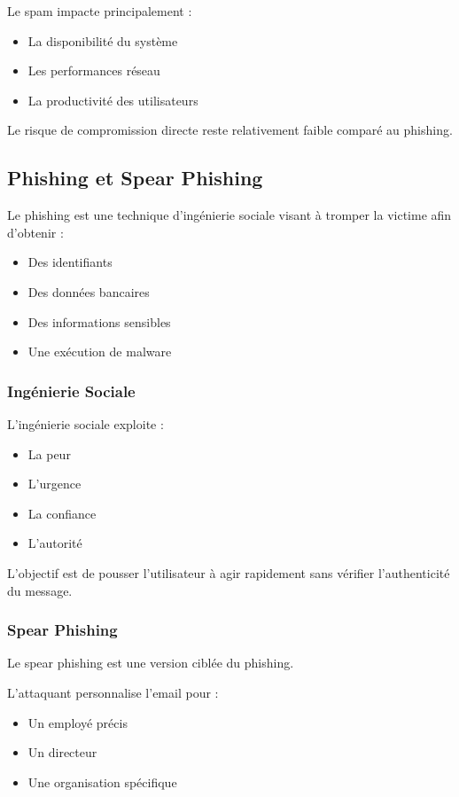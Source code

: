 \documentclass[12pt,a4paper]{article}
\begin{document}
Le spam impacte principalement :
\begin{itemize}
    \item La disponibilité du système
    \item Les performances réseau
    \item La productivité des utilisateurs
\end{itemize}

Le risque de compromission directe reste relativement faible comparé au phishing.

\subsection{Phishing et Spear Phishing}

Le phishing est une technique d'ingénierie sociale visant à tromper la victime afin d'obtenir :
\begin{itemize}
    \item Des identifiants
    \item Des données bancaires
    \item Des informations sensibles
    \item Une exécution de malware
\end{itemize}

\subsubsection{Ingénierie Sociale}

L'ingénierie sociale exploite :
\begin{itemize}
    \item La peur
    \item L'urgence
    \item La confiance
    \item L'autorité
\end{itemize}

L'objectif est de pousser l'utilisateur à agir rapidement sans vérifier l'authenticité du message.

\subsubsection{Spear Phishing}

Le spear phishing est une version ciblée du phishing.

L'attaquant personnalise l'email pour :
\begin{itemize}
    \item Un employé précis
    \item Un directeur
    \item Une organisation spécifique
\end{itemize}
\end{document}
